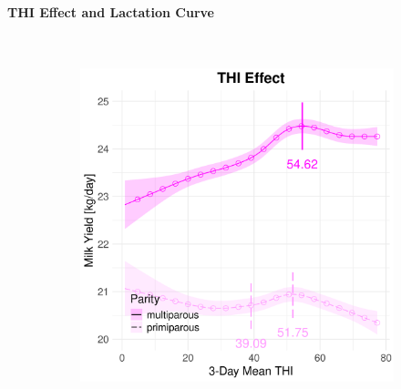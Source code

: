\newpage
\paragraph{THI Effect and Lactation Curve} \quad \\
\begin{figure}[H]
    \centering
    \begin{subfigure}[b]{0.45\textwidth}
        \centering
        \includegraphics[width=\textwidth]{thesis/figures/models/milk/after2010/sf_milk_after2010/sf_milk_after2010_marginal_thi_milk_combined.png}
    \end{subfigure}
    \hspace{0.05\textwidth} %
    \begin{subfigure}[b]{0.45\textwidth}
        \centering

\end{subfigure}
\end{figure}
